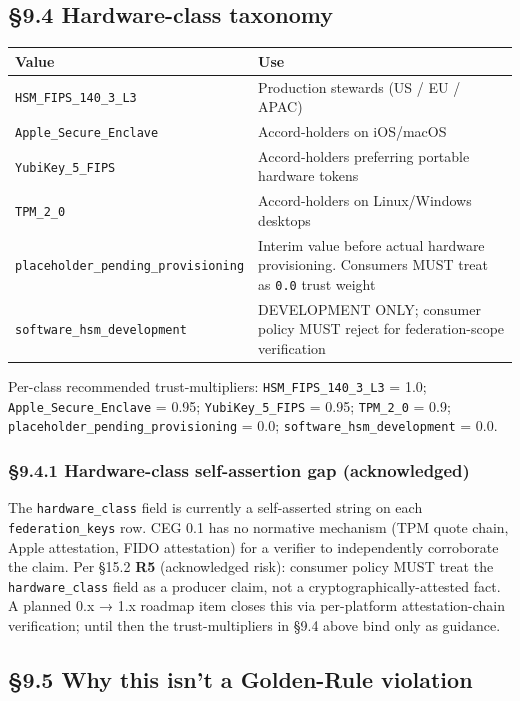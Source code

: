 \documentclass[11pt]{article}
\begin{document}
\subsection*{§9.4 Hardware-class taxonomy}


{\footnotesize
\begin{longtable}{|p{8.0cm}|p{8.0cm}|}\hline
\textbf{Value} & \textbf{Use} \\ \hline\endhead
\texttt{HSM\_FIPS\_140\_3\_L3} & Production stewards (US / EU / APAC) \\ \hline
\texttt{Apple\_Secure\_Enclave} & Accord-holders on iOS/macOS \\ \hline
\texttt{YubiKey\_5\_FIPS} & Accord-holders preferring portable hardware tokens \\ \hline
\texttt{TPM\_2\_0} & Accord-holders on Linux/Windows desktops \\ \hline
\texttt{placeholder\_pending\_provisioning} & Interim value before actual hardware provisioning. Consumers MUST treat as \texttt{0.0} trust weight \\ \hline
\texttt{software\_hsm\_development} & DEVELOPMENT ONLY; consumer policy MUST reject for federation-scope verification \\ \hline
\end{longtable}}


Per-class recommended trust-multipliers: \texttt{HSM\_FIPS\_140\_3\_L3} = 1.0; \texttt{Apple\_Secure\_Enclave} = 0.95; \texttt{YubiKey\_5\_FIPS} = 0.95; \texttt{TPM\_2\_0} = 0.9; \texttt{placeholder\_pending\_provisioning} = 0.0; \texttt{software\_hsm\_development} = 0.0.


\subsubsection*{§9.4.1 Hardware-class self-assertion gap (acknowledged)}


The \texttt{hardware\_class} field is currently a self-asserted string on each \texttt{federation\_keys} row. CEG 0.1 has no normative mechanism (TPM quote chain, Apple attestation, FIDO attestation) for a verifier to independently corroborate the claim. Per §15.2 \textbf{R5} (acknowledged risk): consumer policy MUST treat the \texttt{hardware\_class} field as a producer claim, not a cryptographically-attested fact. A planned 0.x → 1.x roadmap item closes this via per-platform attestation-chain verification; until then the trust-multipliers in §9.4 above bind only as guidance.


\subsection*{§9.5 Why this isn't a Golden-Rule violation}
\end{document}
